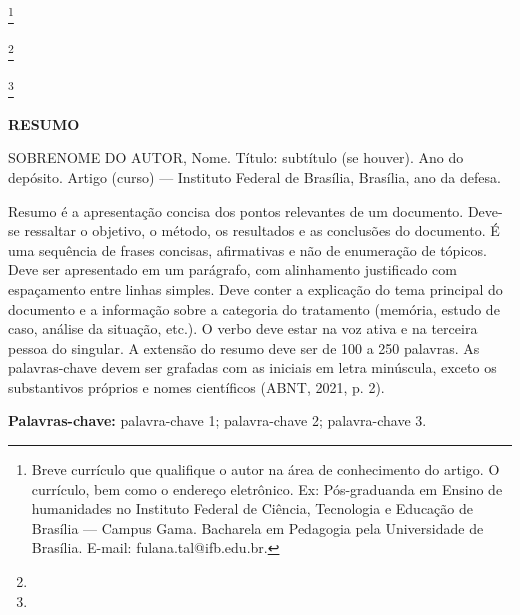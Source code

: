 \documentclass[a4paper, 12pt, twoside]{article}
\newcommand{\autor}{[Nome completo do(a) autor(a)]}
\newcommand{\orientador}{[Nome completo do(a) orientador(a)]}
\newcommand{\coorientador}{[Nome completo do(a) coorientador(a), (se houver)]}
\begin{document}
\singlespacing %
\justifying %



\begin{flushright}

    \par \autor\footnote[*]{Breve currículo que qualifique o autor na área de conhecimento do artigo. O currículo, bem como o endereço eletrônico. Ex: Pós-graduanda em Ensino de humanidades no Instituto Federal de Ciência, Tecnologia e Educação de Brasília — Campus Gama. Bacharela em Pedagogia pela Universidade de Brasília. E-mail: fulana.tal@ifb.edu.br.}

    \par \orientador\footnote[**]{} 

    \par \coorientador\footnote[***]{} \medskip
    
\end{flushright}

\begin{center}

    \par \textbf{\MakeUppercase{Resumo}}
    
\end{center}

\noindent [OPCIONAL] SOBRENOME DO AUTOR, Nome. Título: subtítulo (se houver). Ano do depósito. Artigo (curso) — Instituto Federal de Brasília, Brasília, ano da defesa. \bigskip

\noindent [OBRIGATÓRIO] Resumo é a apresentação concisa dos pontos relevantes de um documento. Deve-se ressaltar o objetivo, o método, os resultados e as conclusões do documento. É uma sequência de frases concisas, afirmativas e não de enumeração de tópicos. Deve ser apresentado em um parágrafo, com alinhamento justificado com espaçamento entre linhas simples. Deve conter a explicação do tema principal do documento e a informação sobre a categoria do tratamento (memória, estudo de caso, análise da situação, etc.). O verbo deve estar na voz ativa e na terceira pessoa do singular. A extensão do resumo deve ser de 100 a 250 palavras. As palavras-chave devem ser grafadas com as iniciais em letra minúscula, exceto os substantivos próprios e nomes científicos (ABNT, 2021, p. 2). \medskip

\noindent \textbf{Palavras-chave:} palavra-chave 1; palavra-chave 2; palavra-chave 3. \bigskip
\end{document}
